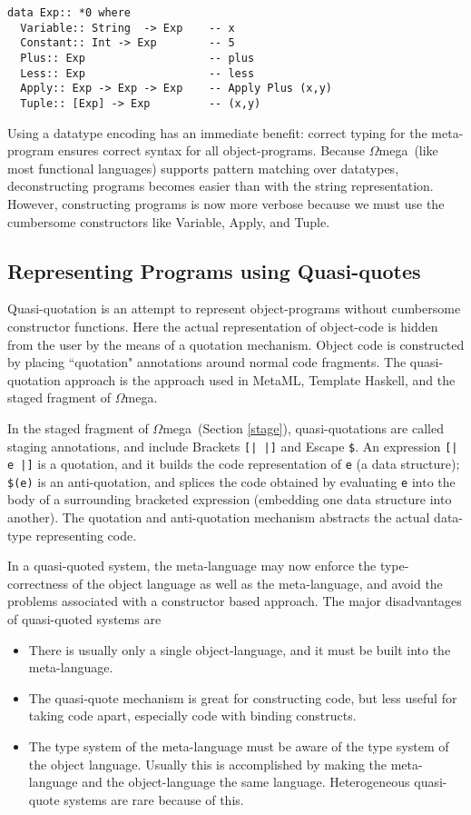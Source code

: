 \documentclass[11pt,twoside,A4]{llncs}
\newcommand{\om}{\emph{$\Omega$}mega}
\begin{document}
{\small 
\begin{verbatim}
data Exp:: *0 where
  Variable:: String  -> Exp    -- x
  Constant:: Int -> Exp        -- 5
  Plus:: Exp                   -- plus
  Less:: Exp                   -- less
  Apply:: Exp -> Exp -> Exp    -- Apply Plus (x,y)
  Tuple:: [Exp] -> Exp         -- (x,y)
\end{verbatim}}
Using a datatype encoding has an immediate benefit: correct typing for the
meta-program ensures correct syntax for all object-programs. Because \om\
(like most functional languages) supports
pattern matching over datatypes, deconstructing programs becomes easier than with
the string representation. However, constructing programs is now more verbose
because we must use the cumbersome constructors like Variable, Apply, and Tuple.

\subsection{Representing Programs using Quasi-quotes}
Quasi-quotation is an attempt to represent object-programs
without cumbersome constructor functions. Here
the actual representation of object-code is hidden from the user by the means of
a quotation mechanism. Object code is constructed by placing ``quotation"
annotations around normal code fragments. 
The quasi-quotation approach is the approach used in MetaML,
Template Haskell, and the staged fragment of \om.

In the staged fragment of \om\ (Section \ref{stage}), quasi-quotations are called staging annotations, 
and include Brackets \verb+[| |]+ and Escape \verb+$+.
An expression \verb+[| e |]+ is a quotation, and it builds the code
representation of \verb+e+ (a data structure); \verb+$(e)+ is an anti-quotation,
and splices the code obtained by evaluating
\verb+e+ into the body of a surrounding bracketed expression (embedding one data structure into
another). The quotation and anti-quotation mechanism abstracts
the actual data-type representing code.

In a quasi-quoted system, the meta-language may now enforce the type-correctness
of the object language as well as the meta-language,
and avoid the problems associated with a constructor based approach.
The major disadvantages of quasi-quoted systems are

\begin{itemize}

\item There is usually only a single object-language, and it must
be built into the meta-language.

\item The quasi-quote mechanism is great for constructing code,
but less useful for taking code apart, especially code
with binding constructs.

\item The type system of the meta-language must be aware of the type system
of the object language. Usually this is accomplished by making
the meta-language and the object-language the same language. Heterogeneous
quasi-quote systems are rare because of this.

\end{itemize}
\end{document}
